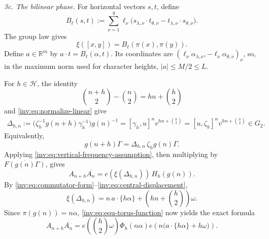 \documentclass[twoside]{aomart}
\makeatletter
\theoremstyle{paperplain}
\theoremstyle{paperdefinition}
\renewenvironment{proof}[1][\proofname]{\par\pushQED{\qed}%
  \normalfont\topsep6\p@\@plus3\p@\relax\trivlist
  \item[\hskip\labelsep\itshape #1\@addpunct{.}]\ignorespaces
}{\popQED\endtrivlist\@endpefalse}
\numberwithin{equation}{section}
\makeatother
\begin{document}
\begin{proof}
\noindent\emph{3c. The bilinear phase.}
For horizontal vectors $s,t$, define
\begin{equation*}
 B_\ell(s,t):=
 \sum_{\nu=1}^{q}\ell_\nu
 \bigl(s_{\lambda,\nu}\cdot t_{\theta,\nu}
       -t_{\lambda,\nu}\cdot s_{\theta,\nu}\bigr).
\end{equation*}
The group law gives
\begin{equation}
 \xi([x,y])=B_\ell(\pi(x),\pi(y)).
\label{inv:eq:commutator-form}
\end{equation}
Define $a\in\mathbb R^m$ by $a\cdot t=B_\ell(\alpha,t)$. Its
coordinates are
$(\ell_\nu\alpha_{\lambda,\nu},-\ell_\nu\alpha_{\theta,\nu})_\nu$,
so, in the maximum norm used for character heights,
$|a|\le M/2\le L$.

For $h\in\mathcal H$, the identity
$$\binom{n+h}{2}-\binom n2=hn+\binom h2$$ and \eqref{inv:eq:normalize-linear} give
\begin{equation*}
 \begin{aligned}
 \Delta_{h,n}
 :=\bigl(\zeta_h^{-1}g(n+h)\gamma_h^{-1}\bigr)g(n)^{-1}
 =[\gamma_h,u]^n v^{hn+\binom h2}
  =[u,\zeta_h]^n v^{hn+\binom h2}\in G_2.
 \end{aligned}
\end{equation*}
Equivalently,
\[
 g(n+h)\Gamma=\Delta_{h,n}\,\zeta_hg(n)\Gamma.
\]
Applying \eqref{inv:eq:vertical-frequency-assumption}, then multiplying by $\overline{F(g(n)\Gamma)}$,
gives
\begin{equation}
 A_{n+h}\overline{A_n}
 =e(\xi(\Delta_{h,n}))\,H_h(g(n)).
\label{inv:eq:central-displacement}
\end{equation}
By \eqref{inv:eq:commutator-form}--\eqref{inv:eq:central-displacement},
 \begin{equation*}
 \xi(\Delta_{h,n})
 =n\,a\cdot\{h\alpha\}
   +\left(hn+\binom h2\right)\omega.
\end{equation*}
Since $\pi(g(n))=n\alpha$, \eqref{inv:eq:equ-torus-function} now yields the exact formula
\begin{equation}
 A_{n+h}\overline{A_n}
 =e\left(\binom h2\omega\right)\Phi_h(n\alpha)
  e\left(n\bigl(a\cdot\{h\alpha\}+h\omega\bigr)\right).
\label{inv:eq:equ-derivative-phase}
\end{equation}


\end{proof}
\end{document}

